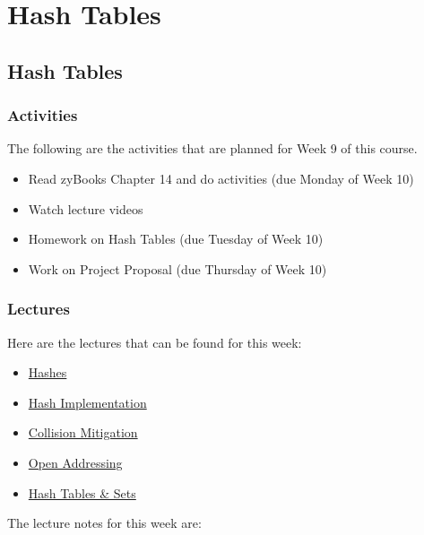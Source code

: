 \clearpage

\renewcommand{\ChapTitle}{Hash Tables}

\chapter{\ChapTitle}
\section{\ChapTitle}

\subsection{Activities}

The following are the activities that are planned for Week 9 of this course.

\begin{itemize}
    \item Read zyBooks Chapter 14 and do activities (due Monday of Week 10)
    \item Watch lecture videos
    \item Homework on Hash Tables (due Tuesday of Week 10)
    \item Work on Project Proposal (due Thursday of Week 10)
\end{itemize}

\subsection{Lectures}

Here are the lectures that can be found for this week:

\begin{itemize}
    \item \href{https://applied.cs.colorado.edu/mod/hvp/view.php?id=46014}{Hashes}
    \item \href{https://applied.cs.colorado.edu/mod/hvp/view.php?id=46015}{Hash Implementation}
    \item \href{https://applied.cs.colorado.edu/mod/hvp/view.php?id=46016}{Collision Mitigation}
    \item \href{https://applied.cs.colorado.edu/mod/hvp/view.php?id=46017}{Open Addressing}
    \item \href{https://applied.cs.colorado.edu/mod/hvp/view.php?id=46018}{Hash Tables \& Sets}
\end{itemize}

\noindent The lecture notes for this week are:

